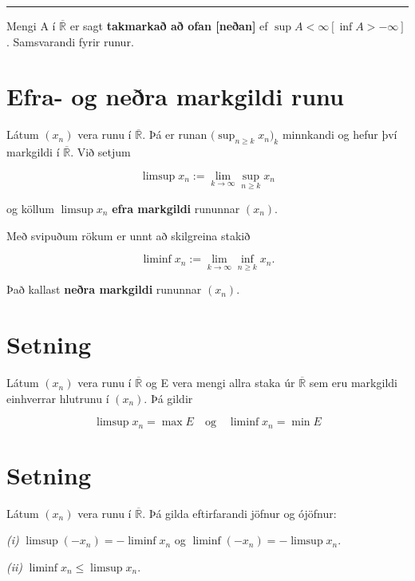 \documentclass[]{book}
\begin{document}
\begin{center}\rule{0.5\linewidth}{\linethickness}\end{center}

Mengi A í \(\overline{\mathbb R}\) er sagt \textbf{takmarkað að ofan {[}neðan{]}} ef \(\sup A < \infty [\inf A > -\infty]\). Samsvarandi fyrir runur.

\hypertarget{efra--og-nera-markgildi-runu}{%
\section{Efra- og neðra markgildi runu}\label{efra--og-nera-markgildi-runu}}

Látum \((x_n)\) vera runu í \(\overline{\mathbb R}\). Þá er runan \(\big(\sup_{n\geq k}x_n\big)_k\) minnkandi og hefur því markgildi í \(\overline{\mathbb R}\). Við setjum

\[
\limsup x_n := \lim_{k\rightarrow \infty}\sup_{n\geq k}x_n
\]

og köllum \(\limsup x_n\) \textbf{efra markgildi} rununnar \((x_n)\).

Með svipuðum rökum er unnt að skilgreina stakið

\[
\liminf x_n := \lim_{k\rightarrow \infty}\inf_{n\geq k}x_n.
\]

Það kallast \textbf{neðra markgildi} rununnar \((x_n)\).

\hypertarget{setning}{%
\section{Setning}\label{setning}}

Látum \((x_n)\) vera runu í \(\overline{\mathbb R}\) og E vera mengi allra staka úr \(\overline{\mathbb R}\) sem eru markgildi einhverrar hlutrunu í \((x_n)\). Þá gildir

\[
\limsup x_n = \max E \quad \text{og} \quad \liminf x_n = \min E
\]

\hypertarget{setning-1}{%
\section{Setning}\label{setning-1}}

Látum \((x_n)\) vera runu í \(\overline{\mathbb R}\). Þá gilda eftirfarandi jöfnur og ójöfnur:

\emph{(i)} \(\limsup (-x_n) = -\liminf x_n\) og \(\liminf (-x_n) = -\limsup x_n\).

\emph{(ii)} \(\liminf x_n \leq \limsup x_n\).
\end{document}
